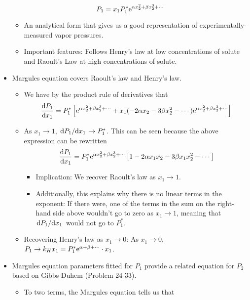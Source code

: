 \documentclass[../notes.tex]{subfiles}
\begin{document}
\begin{itemize}
\begin{equation*}
        P_1 = x_1P_1^*\e[\alpha x_2^2+\beta x_2^3+\cdots]
    \end{equation*}
    \begin{itemize}
        \item An analytical form that gives us a good representation of experimentally-measured vapor pressures.
        \item Important features: Follows Henry's law at low concentrations of solute and Raoult's Law at high concentrations of solute.
    \end{itemize}
    \item Margules equation covers Raoult's law and Henry's law.
    \begin{itemize}
        \item We have by the product rule of derivatives that
        \begin{equation*}
            \dv{P_1}{x_1} = P_1^*\left[ \e[\alpha x_2^2+\beta x_2^3+\cdots]+x_1(-2\alpha x_2-3\beta x_2^2-\cdots)\e[\alpha x_2^2+\beta x_2^3+\cdots] \right]
        \end{equation*}
        \item As $x_1\to 1$, $\dv*{P_1}{x_1}\to P_1^*$. This can be seen because the above expression can be rewritten
        \begin{equation*}
            \dv{P_1}{x_1} = P_1^*\e[\alpha x_2^2+\beta x_2^3+\cdots]\left[ 1-2\alpha x_1x_2-3\beta x_1x_2^2-\cdots \right]
        \end{equation*}
        \begin{itemize}
            \item Implication: We recover Raoult's law as $x_1\to 1$.
            \item Additionally, this explains why there is no linear terms in the exponent: If there were, one of the terms in the sum on the right-hand side above wouldn't go to zero as $x_1\to 1$, meaning that $\dv*{P_1}{x_1}$ would not go to $P_1^*$.
        \end{itemize}
        \item Recovering Henry's law as $x_1\to 0$: As $x_1\to 0$, $P_1\to k_Hx_1=P_1^*\e[\alpha+\beta+\cdots]\cdot x_1$.
    \end{itemize}
    \item Margules equation parameters fitted for $P_1$ provide a related equation for $P_2$ based on Gibbs-Duhem (Problem 24-33).
    \begin{itemize}
        \item To two terms, the Margules equation tells us that

\end{itemize}
\end{itemize}
\end{document}
